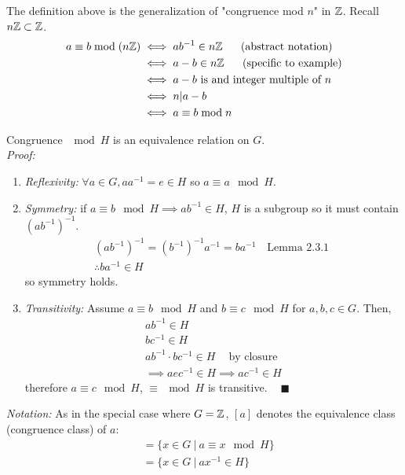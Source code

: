 \begin{example}
The definition above is the generalization of "congruence mod $n$" in ${\mathbb{Z}}$. Recall $n{\mathbb{Z}} \subset {\mathbb{Z}}$.
\begin{align}
    a\equiv b\mod (n\Z) &\iff ab^{-1}\in n\Z \ \ \ \ \ \text{(abstract notation)}\nonumber \\
     &\iff a-b \in n\Z \ \ \ \ \ \text{(specific to example)}\nonumber \\
     &\iff a-b \text{ is and integer multiple of }n \nonumber \\
     &\iff n|a-b \nonumber \\
     &\iff a\equiv b\mod n \nonumber
\end{align}
\end{example}
\begin{lemma}
Congruence $\mod H$ is an equivalence relation on $G$.\\
\textit{Proof:}\\
\begin{enumerate}
    \item \textit{Reflexivity:} $\forall a \in G, aa^{-1}=e\in H$ so $a\equiv a \mod H$.
    \item \textit{Symmetry:} if $a\equiv b \mod H \implies ab^{-1}\in H$, $H$ is a subgroup so it
    must contain $(ab^{-1})^{-1}$.
    \begin{align}
        (ab^{-1})^{-1}=(b^{-1})^{-1}a^{-1}=ba^{-1} \ \ \ \text{ Lemma 2.3.1 } \nonumber \\
        \therefore ba^{-1}\in H \nonumber
    \end{align}
    so symmetry holds.
    \item \textit{Transitivity:} Assume $a\equiv b \mod H$ and $b\equiv c \mod H$ for $a,b,c \in G$.
    Then,
    \begin{align}
        ab^{-1}\in H \nonumber \\
        bc^{-1}\in H \nonumber \\
        ab^{-1}\cdot bc^{-1}\in H \ \ \ \ \text{ by closure}\nonumber \\
        \implies aec^{-1}\in H \implies ac^{-1}\in H \nonumber
    \end{align}
    therefore $a\equiv c \mod H$, $\equiv \mod H$ is transitive. $\ \ \ \ \blacksquare$
\end{enumerate}
\textit{Notation:} As in the special case where $G={\mathbb{Z}}$, $[a]$ denotes the equivalence class
(congruence class) of $a$:
\begin{align}
    [a]&=\{x\in G \ | \ a\equiv x\mod H\} \nonumber \\
    &=\{x\in G \ | \ a x^{-1} \in H\} \nonumber
\end{align}
\end{lemma}
